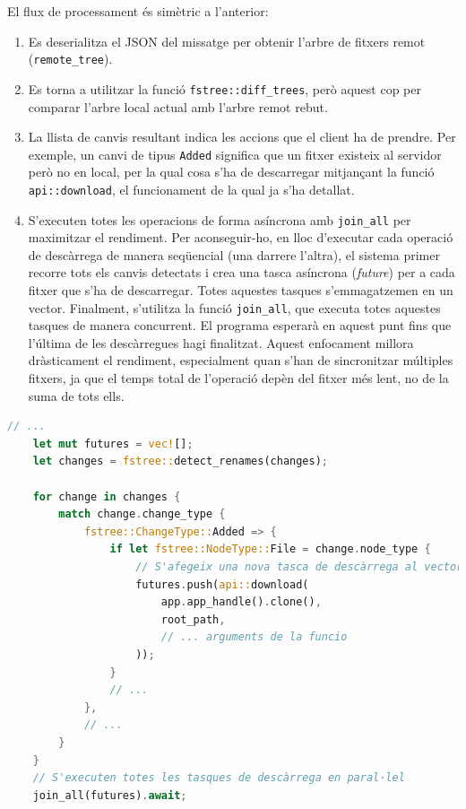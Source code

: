 El flux de processament és simètric a l'anterior:
\begin{enumerate}
    \item Es deserialitza el JSON del missatge per obtenir l'arbre de fitxers remot (\texttt{remote\_tree}).
    \item Es torna a utilitzar la funció \texttt{fstree::diff\_trees}, però aquest cop per comparar l'arbre local actual amb l'arbre remot rebut.
    \item La llista de canvis resultant indica les accions que el client ha de prendre. Per exemple, un canvi de tipus \texttt{Added} significa que un fitxer existeix al servidor però no en local, per la qual cosa s'ha de descarregar mitjançant la funció \texttt{api::download}, el funcionament de la qual ja s'ha detallat.
    \item S'executen totes les operacions de forma asíncrona amb \texttt{join\_all} per maximitzar el rendiment. Per aconseguir-ho, en lloc d'executar cada operació de descàrrega de manera seqüencial (una darrere l'altra), el sistema primer recorre tots els canvis detectats i crea una tasca asíncrona (\textit{future}) per a cada fitxer que s'ha de descarregar. Totes aquestes tasques s'emmagatzemen en un vector. Finalment, s'utilitza la funció \texttt{join\_all}, que executa totes aquestes tasques de manera concurrent. El programa esperarà en aquest punt fins que l'última de les descàrregues hagi finalitzat. Aquest enfocament millora dràsticament el rendiment, especialment quan s'han de sincronitzar múltiples fitxers, ja que el temps total de l'operació depèn del fitxer més lent, no de la suma de tots ells.
\end{enumerate}

\begin{lstlisting}[language=rust, caption={Execució concurrent de descàrregues amb \texttt{join\_all} a \texttt{synchronizer.rs}}]
    // ...
    let mut futures = vec![];
    let changes = fstree::detect_renames(changes);
    
    for change in changes {
        match change.change_type {
            fstree::ChangeType::Added => {
                if let fstree::NodeType::File = change.node_type {
                    // S'afegeix una nova tasca de descàrrega al vector de futures
                    futures.push(api::download(
                        app.app_handle().clone(),
                        root_path,
                        // ... arguments de la funcio
                    ));
                }
                // ...
            },
            // ...
        }
    }
    // S'executen totes les tasques de descàrrega en paral·lel
    join_all(futures).await;
\end{lstlisting}

